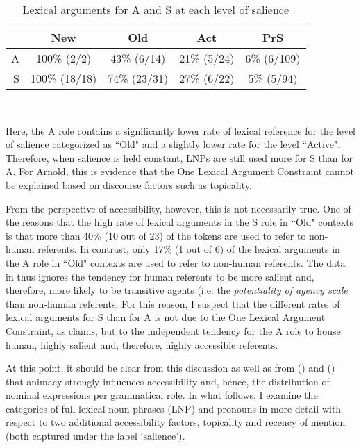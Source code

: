 \begin{table}[htp] 
\begin{center}
\caption{\small{Lexical arguments for A and S at each level of salience}}
\begin{tabular}{| r | c | c | c | c |}\hline
 & New & Old & Act & PrS \\
\hline
 A & 100{\%} (2/2) & 43{\%} (6/14) & 21{\%} (5/24)  & 6{\%} (6/109) \\
\hline
S & 100{\%} (18/18) & 74{\%} (23/31) & 27{\%} (6/22) & 5{\%} (5/94) \\
\hline
\end{tabular}\\
\label{ASsalience}
\end{center}
\end{table}
Here, the A role contains a significantly lower rate of lexical reference for the level of salience categorized as ``Old" and a slightly lower rate for the level ``Active". Therefore, when salience is held constant, LNPs are still used more for S than for A. For Arnold, this is evidence that the One Lexical Argument Constraint cannot be explained based on discourse factors such as topicality.

From the perspective of accessibility, however, this is not necessarily true. One of the reasons that the high rate of lexical arguments in the S role in ``Old" contexts is that more than 40{\%} (10 out of 23) of the tokens are used to refer to non-human referents. In contrast, only 17{\%} (1 out of 6) of the lexical arguments in the A role in ``Old" contexts are used to refer to non-human referents. The data in  thus ignores the tendency for human referents to be more salient and, therefore, more likely to be transitive agents (i.e. the \textit{potentiality of agency scale} \citep{silverstein1976} than non-human referents. For this reason, I suspect that the different rates of lexical arguments for S than for A is not due to the One Lexical Argument Constraint, as \citet{arnold2003} claims, but to the independent tendency for the A role to house human, highly salient and, therefore, highly accessible referents.


At this point, it should be clear from this discussion as well as from  () and  () that animacy strongly influences accessibility and, hence, the distribution of nominal expressions per grammatical role. In what follows, I examine the categories of full lexical noun phrases (LNP) and pronouns in more detail with respect to two additional accessibility factors, topicality and recency of mention (both captured under the label `salience').


